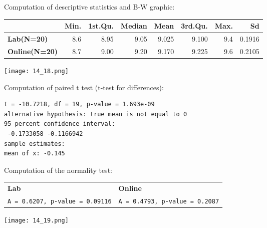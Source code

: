 \begin{frame}
  Computation of descriptive statistics and B-W graphic:\\
  \vspace{.3cm}
  \begin{scriptsize}
    \begin{center}
      \begin{tabular}{|l|rrrrrrr|}
        \hline
        & \textbf{Min}. & 1\textbf{st.Qu}. & \textbf{Median} & \textbf{Mean} & \textbf{3rd.Qu.} & \textbf{Max.} & \textbf{Sd}\\
        \hline
        \textbf{Lab(N=20)} & 8.6 & 8.95 & 9.05 & 9.025 & 9.100 & 9.4 & 0.1916\\
        \textbf{Online(N=20)} & 8.7 & 9.00 & 9.20 & 9.170 & 9.225 & 9.6 & 0.2105\\
        \hline
      \end{tabular}
      \texttt{[image: 14\_18.png]}
    \end{center}
  \end{scriptsize}
\end{frame}

\begin{frame}[fragile]
  Computation of paired t test (t-test for differences):\\
  \begin{verbatim}
t = -10.7218, df = 19, p-value = 1.693e-09
alternative hypothesis: true mean is not equal to 0
95 percent confidence interval:
 -0.1733058 -0.1166942
sample estimates:
mean of x: -0.145
  \end{verbatim}
\end{frame}

\begin{frame}
  Computation of the normality test:\\
  \vspace{.3cm}
  \begin{scriptsize}
    \begin{tabular}{ll}
      \textbf{Lab } & \textbf{Online}\\
      \texttt{A = 0.6207, p-value = 0.09116} & \texttt{A = 0.4793, p-value = 0.2087}\\
    \end{tabular} 
  \end{scriptsize}
  \begin{center}
    \texttt{[image: 14\_19.png]}
  \end{center}
\end{frame}

